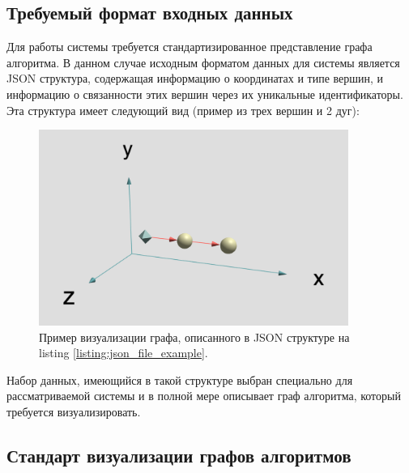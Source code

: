 \subsection{Требуемый формат входных данных}

Для работы системы требуется стандартизированное представление графа алгоритма. В данном случае исходным форматом данных для системы является JSON структура, содержащая информацию о координатах и типе вершин, и информацию о связанности этих вершин через их уникальные идентификаторы. Эта структура имеет следующий вид (пример из трех вершин и 2 дуг):


\begin{figure}[!ht]
    \centering
    \includegraphics[width=0.9\textwidth]{assets/json_image.png}
    \caption{Пример визуализации графа, описанного в JSON структуре на listing \ref{listing:json_file_example}.}
    \label{fig:mesh1}
\end{figure}


Набор данных, имеющийся в такой структуре выбран специально для рассматриваемой системы и в полной мере описывает граф алгоритма, который требуется визуализировать.


\subsection{Стандарт визуализации графов алгоритмов}

